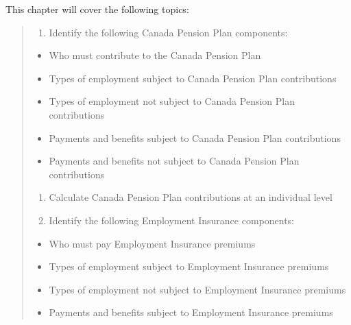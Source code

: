\documentclass[letterpaper,10pt,english]{sphinxmanual}
\begin{document}
\sphinxAtStartPar
This chapter will cover the following topics:
\begin{quote}
\begin{enumerate}
%
\item {} 
\sphinxAtStartPar
Identify the following Canada Pension Plan components:

\end{enumerate}
\begin{itemize}
\item {} 
\sphinxAtStartPar
Who must contribute to the Canada Pension Plan

\item {} 
\sphinxAtStartPar
Types of employment subject to Canada Pension Plan contributions

\item {} 
\sphinxAtStartPar
Types of employment not subject to Canada Pension Plan contributions

\item {} 
\sphinxAtStartPar
Payments and benefits subject to Canada Pension Plan contributions

\item {} 
\sphinxAtStartPar
Payments and benefits not subject to Canada Pension Plan contributions

\end{itemize}
\begin{enumerate}
%
\setcounter{enumi}{1}
\item {} 
\sphinxAtStartPar
Calculate Canada Pension Plan contributions at an individual level

\item {} 
\sphinxAtStartPar
Identify the following Employment Insurance components:

\end{enumerate}
\begin{itemize}
\item {} 
\sphinxAtStartPar
Who must pay Employment Insurance premiums

\item {} 
\sphinxAtStartPar
Types of employment subject to Employment Insurance premiums

\item {} 
\sphinxAtStartPar
Types of employment not subject to Employment Insurance premiums

\item {} 
\sphinxAtStartPar
Payments and benefits subject to Employment Insurance premiums


\end{itemize}
\end{quote}
\end{document}
